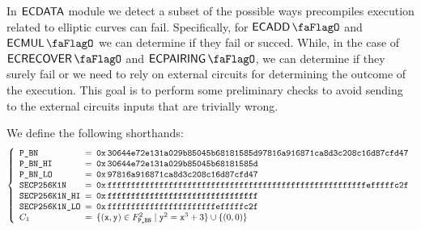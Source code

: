 In $\textsf{ECDATA}$ module we detect a subset of the possible ways precompiles execution related to elliptic curves can fail. Specifically, for $\ecAdd$ and $\ecMul$ we can determine if they fail or succed. While, in the case of $\ecRecover$ and $\ecPairing$, we can determine if they surely fail or we need to rely on external circuits for determining the outcome of the execution.
This goal is to perform some preliminary checks to avoid sending to the external circuits inputs that are
trivially wrong.

We define the following shorthands:
\[
    \left\{
    \begin{array}{lcl}
        \bnOuterPrime
         & \!\!\! = \!\!\! & \bnOuterPrimeHex                                                                     \\
        \bnOuterPrimeHi
         & \!\!\! = \!\!\! & \bnOuterPrimeHexHi                                                                   \\
        \bnOuterPrimeLo
         & \!\!\! = \!\!\! & \bnOuterPrimeHexLo                                                                   \\
        \secpN
         & \!\!\! = \!\!\! & \secpNHex                                                                            \\
        \secpNHi
         & \!\!\! = \!\!\! & \secpNHexHi                                                                          \\
        \secpNLo
         & \!\!\! = \!\!\! & \secpNHexLo                                                                          \\
        C_1
         & \!\!\! = \!\!\! & \{ (\ttx, \tty) \in F_{\bnOuterPrime}^2 \mid \tty^2 = \ttx^3 + 3 \} \cup \{ (0, 0)\}
    \end{array}
    \right.
\]
